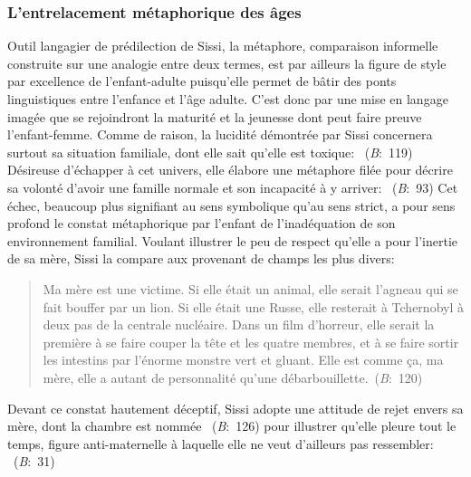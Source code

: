 \subsubsection{L'entrelacement métaphorique des âges}
Outil langagier de prédilection de Sissi, la métaphore, comparaison informelle construite sur une analogie entre deux termes, est par ailleurs la figure de style par excellence de l'enfant-adulte puisqu'elle permet de bâtir des ponts linguistiques entre l'enfance et l'âge adulte.
C'est donc par une mise en langage imagée que se rejoindront la maturité et la jeunesse dont peut faire preuve l'enfant-femme.
Comme de raison, la lucidité démontrée par Sissi concernera surtout sa situation familiale, dont elle sait qu'elle est toxique: ~(\textit{B}:~119)
Désireuse d'échapper à cet univers, elle élabore une métaphore filée pour décrire sa volonté d'avoir une famille normale et son incapacité à y arriver: ~(\textit{B}:~93)
Cet échec, beaucoup plus signifiant au sens symbolique qu'au sens strict, a pour sens profond le constat métaphorique par l'enfant de l'inadéquation de son environnement familial.
Voulant illustrer le peu de respect qu'elle a pour l'inertie de sa mère, Sissi la compare aux  provenant de champs les plus divers:
\begin{quote}
  \begin{singlespace}
    \small
    Ma mère est une victime. Si elle était un animal, elle serait l'agneau qui se fait bouffer par un lion. Si elle était une Russe, elle resterait à Tchernobyl à deux pas de la centrale nucléaire. Dans un film d'horreur, elle serait la première à se faire couper la tête et les quatre membres, et à se faire sortir les intestins par l'énorme monstre vert et gluant. Elle est comme ça, ma mère, elle a autant de personnalité qu'une débarbouillette.~(\textit{B}:~120)
    \normalsize
  \end{singlespace}
\end{quote}
Devant ce constat hautement déceptif, Sissi adopte une attitude de rejet envers sa mère, dont la chambre est nommée ~(\textit{B}:~126) pour illustrer qu'elle pleure tout le temps, figure anti-maternelle à laquelle elle ne veut d'ailleurs pas ressembler: ~(\textit{B}:~31)

